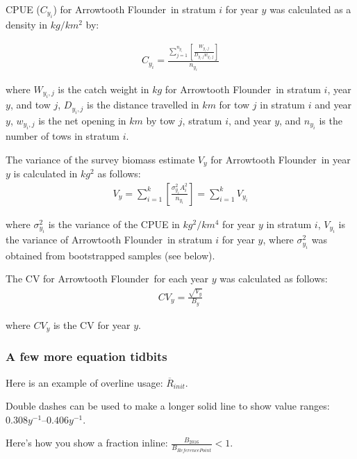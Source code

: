 \documentclass[11pt]{book}\usepackage[]{graphicx}\usepackage[]{color}
\newcommand{\fishnameARF}{Arrowtooth Flounder}
\begin{document}
CPUE ($C_{y_i}$) for \fishnameARF\ in stratum $i$ for year $y$ was calculated as a density in $kg/km^2$ by:

\begin{align} \label{eq:cpuecalc}
C_{y_i}=\frac{\sum\limits_{j=1}^{n_{y_i}} \left[\frac{W_{y_i,j}}{D_{y_i,j}w_{y_i,j}}\right]}{n_{y_i}}
\end{align}
\begin{addmargin}[3em]{1em}
where $W_{y_i,j}$ is the catch weight in $kg$ for \fishnameARF\ in stratum $i$, year $y$, and tow $j$, $D_{y_i,j}$ is the distance travelled in $km$ for tow $j$ in stratum $i$ and year $y$, $w_{y_i,j}$ is the net opening in $km$ by tow $j$, stratum $i$, and year $y$, and $n_{y_i}$ is the number of tows in stratum $i$.
\end{addmargin}

The variance of the survey biomass estimate $V_y$ for \fishnameARF\ in year $y$ is calculated in $kg^2$ as follows:
\begin{align} \label{eq:indexvariance}
V_y=\sum_{i=1}^k\left[\frac{\sigma_{y_i}^2A_i^2}{n_{y_i}}\right]=\sum_{i=1}^kV_{y_i}
\end{align}
\begin{addmargin}[3em]{1em}
where $\sigma_{y_i}^2$ is the variance of the CPUE in $kg^2/km^4$ for year $y$ in stratum $i$, $V_{y_i}$ is the variance of \fishnameARF\ in stratum $i$ for year $y$, where $\sigma_{y_i}^2$ was obtained from bootstrapped samples (see below).
\end{addmargin}

The CV for \fishnameARF\ for each year $y$ was calculated as follows:
\begin{align} \label{eq:indexcv}
CV_y=\frac{\sqrt{V_y}}{B_y}
\end{align}
\begin{addmargin}[3em]{1em}
where $CV_y$ is the CV for year $y$.
\end{addmargin}

\subsubsection{A few more equation tidbits}

Here is an example of overline usage: $\overline{R}_{init}$.

Double dashes can be used to make a longer solid line to show value ranges: $0.308 y^{-1}$--$0.406 y^{-1}$.

Here's how you show a fraction inline: $\frac{B_{2016}}{B_{ReferencePoint}} < 1$.
\end{document}

